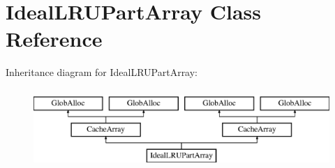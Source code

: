 \hypertarget{classIdealLRUPartArray}{\section{Ideal\-L\-R\-U\-Part\-Array Class Reference}
\label{classIdealLRUPartArray}
}
Inheritance diagram for Ideal\-L\-R\-U\-Part\-Array\-:\begin{figure}[H]
\begin{center}
\leavevmode
\includegraphics[height=3.000000cm]{classIdealLRUPartArray}
\end{center}
\end{figure}

